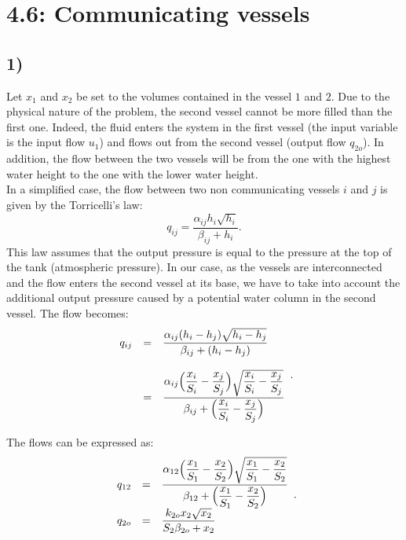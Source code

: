 \section*{4.6: Communicating vessels}

\subsection*{1)}
Let $x_1$ and $x_2$ be set to the volumes contained in the vessel $1$ and $2$. Due to the physical nature of the problem, the second vessel cannot be more filled than the first one. Indeed, the fluid enters the system in the first vessel (the input variable is the input flow $u_1$) and flows out from the second vessel (output flow $q_{2o}$). In addition, the flow between the two vessels will be from the one with the highest water height to the one with the lower water height.\\

In a simplified case, the flow between two non communicating vessels $i$ and $j$ is given by the Torricelli's law:
\begin{equation}
q_{ij}=\dfrac{\alpha_{ij}h_i\sqrt{h_i}}{\beta_{ij}+h_i}.
\label{eq:torricelli}
\end{equation}
This law assumes that the output pressure is equal to the pressure at the top of the tank (atmospheric pressure). In our case, as the vessels are interconnected and the flow enters the second vessel at its base, we have to take into account the additional output pressure caused by a potential water column in the second vessel. The flow becomes:
\begin{equation}
	\begin{array}{r c l}
	q_{ij} &=& \dfrac{\alpha_{ij}(h_i-h_j)\sqrt{h_i-h_j}}{\beta_{ij}+(h_i-h_j)}\\
	& & \\
	          &=& \dfrac{\alpha_{ij}\Big(\dfrac{x_i}{S_i}-\dfrac{x_j}{S_j}\Big)\sqrt{\dfrac{x_i}{S_i}-\dfrac{x_j}{S_j}}}{\beta_{ij}+\Big(\dfrac{x_i}{S_i}-\dfrac{x_j}{S_j}\Big)}\\
	  \end{array}.
\label{eq:torricellimod}
\end{equation}

The flows can be expressed as:
\begin{equation}
	\begin{array}{r c l}         
	 q_{12} &=&\dfrac{\alpha_{12}\Big(\dfrac{x_1}{S_1}-\dfrac{x_2}{S_2}\Big)\sqrt{\dfrac{x_1}{S_1}-\dfrac{x_2}{S_2}}}{\beta_{12}+\Big(\dfrac{x_1}{S_1}-\dfrac{x_2}{S_2}\Big)} \\
	 q_{2o}&=&\dfrac{k_{2o}x_2\sqrt{x_2}}{S_2\beta_{2o}+x_2}\\
	\end{array}.
\label{eq:flow6}
\end{equation}

